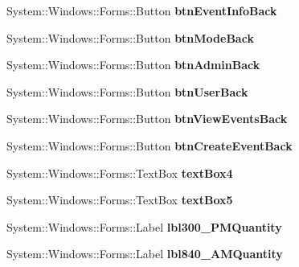 \begin{DoxyCompactItemize}
System\+::\+Windows\+::\+Forms\+::\+Button {\bfseries btn\+Event\+Info\+Back}
\item 
\mbox{\label{class_project1_1_1_my_form_a52a9eb084b8eb56f9a779c873a7ca1a7}} 
System\+::\+Windows\+::\+Forms\+::\+Button {\bfseries btn\+Mode\+Back}
\item 
\mbox{\label{class_project1_1_1_my_form_a21167d6b23a4a7d5026ee694e4e5f5c2}} 
System\+::\+Windows\+::\+Forms\+::\+Button {\bfseries btn\+Admin\+Back}
\item 
\mbox{\label{class_project1_1_1_my_form_a112b0d865b7ee1d0fcb2c510737878dd}} 
System\+::\+Windows\+::\+Forms\+::\+Button {\bfseries btn\+User\+Back}
\item 
\mbox{\label{class_project1_1_1_my_form_af93ca5b423003b0b19c643a19dac8076}} 
System\+::\+Windows\+::\+Forms\+::\+Button {\bfseries btn\+View\+Events\+Back}
\item 
\mbox{\label{class_project1_1_1_my_form_a2e7d9cad86d8f63633b8a2ab62291b76}} 
System\+::\+Windows\+::\+Forms\+::\+Button {\bfseries btn\+Create\+Event\+Back}
\item 
\mbox{\label{class_project1_1_1_my_form_a368a32ae653c8f701442ababbeaabf64}} 
System\+::\+Windows\+::\+Forms\+::\+Text\+Box {\bfseries text\+Box4}
\item 
\mbox{\label{class_project1_1_1_my_form_ab0393542488e42cc635d6e1e04c8e06e}} 
System\+::\+Windows\+::\+Forms\+::\+Text\+Box {\bfseries text\+Box5}
\item 
\mbox{\label{class_project1_1_1_my_form_a1120b505a9bfbd19f1950006bdf491c4}} 
System\+::\+Windows\+::\+Forms\+::\+Label {\bfseries lbl300\+\_\+P\+M\+Quantity}
\item 
\mbox{\label{class_project1_1_1_my_form_add49172afaeefe715ceca320c6e6095e}} 
System\+::\+Windows\+::\+Forms\+::\+Label {\bfseries lbl840\+\_\+A\+M\+Quantity}
\item 
\mbox{\label{class_project1_1_1_my_form_ab4d51241f2d8afc56de20c5cd2a552f0}} 

\end{DoxyCompactItemize}
